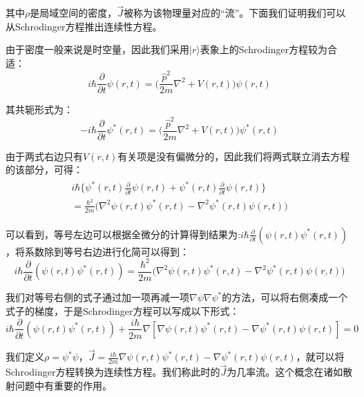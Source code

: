     其中$\rho$是局域空间的密度，$\Vec{J}$被称为该物理量对应的“流”。下面我们证明我们可以从Schrodinger方程推出连续性方程。
    
    由于密度一般来说是时空量，因此我们采用$|r\rangle$表象上的Schrodinger方程较为合适：
    \begin{equation}
        i\hbar\frac{\partial}{\partial t}\psi(r,t)=\Big(\frac{\hat{p}^2}{2m}\nabla^2+V(r,t)\Big)\psi(r,t)
    \end{equation}
    
    其共轭形式为：
    \begin{equation}
        -i\hbar\frac{\partial}{\partial t}\psi^*(r,t)=\Big(\frac{\hat{p}^2}{2m}\nabla^2+V(r,t)\Big)\psi^*(r,t)
    \end{equation}
    
    由于两式右边只有$V(r,t)$有关项是没有偏微分的，因此我们将两式联立消去方程的该部分，可得：
    \begin{align}
        \begin{split}
            i\hbar\Big\{\psi^*(r,t)\frac{\partial}{\partial t}\psi(r,t)+\psi^*(r,t)\frac{\partial}{\partial t}\psi(r,t)\Big\}\\
            =\frac{\hbar^2}{2m}\Big(\nabla^2\psi(r,t)\psi^*(r,t)-\nabla^2\psi^*(r,t)\psi(r,t)\Big)
        \end{split}
    \end{align}
    
    可以看到，等号左边可以根据全微分的计算得到结果为:$i\hbar\frac{\partial}{\partial t}(\psi(r,t)\psi^*(r,t))$，将系数除到等号右边进行化简可以得到：
    \begin{equation}
        i\hbar\frac{\partial}{\partial t}(\psi(r,t)\psi^*(r,t))=\frac{\hbar^2}{2m}\Big(\nabla^2\psi(r,t)\psi^*(r,t)-\nabla^2\psi^*(r,t)\psi(r,t)\Big)
    \end{equation}
    
    我们对等号右侧的式子通过加一项再减一项$\nabla\psi\nabla\psi^*$的方法，可以将右侧凑成一个式子的梯度，于是Schrodinger方程可以写成以下形式：
    \begin{equation}
        i\hbar\frac{\partial}{\partial t}(\psi(r,t)\psi^*(r,t))+\frac{i\hbar}{2m}\nabla[\nabla\psi(r,t)\psi^*(r,t)-\nabla\psi^*(r,t)\psi(r,t)]=0
    \end{equation}
    
    我们定义$\rho=\psi^*\psi$，$\Vec{J}=\frac{i\hbar}{2m}\nabla\psi(r,t)\psi^*(r,t)-\nabla\psi^*(r,t)\psi(r,t)$，就可以将Schrodinger方程转换为连续性方程。我们称此时的$\Vec{J}$为几率流。这个概念在诸如散射问题中有重要的作用。
